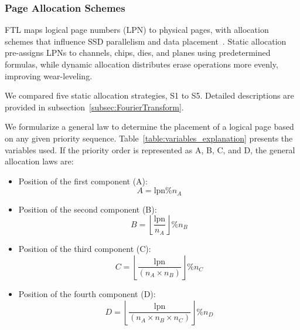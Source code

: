 \documentclass{ieeeaccess}
\begin{document}
\subsubsection{Page Allocation Schemes}

FTL maps logical page numbers (LPN) to physical pages, with allocation schemes that influence SSD parallelism and data placement~\cite{allocation-strategy-ics11, pagealloc-hotstorage12}. Static allocation pre-assigns LPNs to channels, chips, dies, and planes using predetermined formulas, while dynamic allocation distributes erase operations more evenly, improving wear-leveling. 

 We compared five static allocation strategies, S1 to S5. Detailed descriptions are provided in subsection~\ref{subsec:FourierTransform}.

We formularize a general law to determine the placement of a logical page based on any given priority sequence. Table~\ref{table:variables_explanation} presents the variables used. If the priority order is represented as A, B, C, and D, the general allocation laws are:

\begin{itemize}
 \item {Position of the first component (A)}:
 \[
 A = \text{lpn} \% n_A
 \]
 \item {Position of the second component (B)}:
 \[
 B = \left\lfloor \frac{\text{lpn}}{n_A} \right\rfloor \% n_B
 \]
 \item {Position of the third component (C)}:
 \[
 C = \left\lfloor \frac{\text{lpn}}{(n_A \times n_B)} \right\rfloor \% n_C
 \]
 \item {Position of the fourth component (D)}:
 \[
 D = \left\lfloor \frac{\text{lpn}}{(n_A \times n_B \times n_C)} \right\rfloor \% n_D
 \]
\end{itemize}
\end{document}

